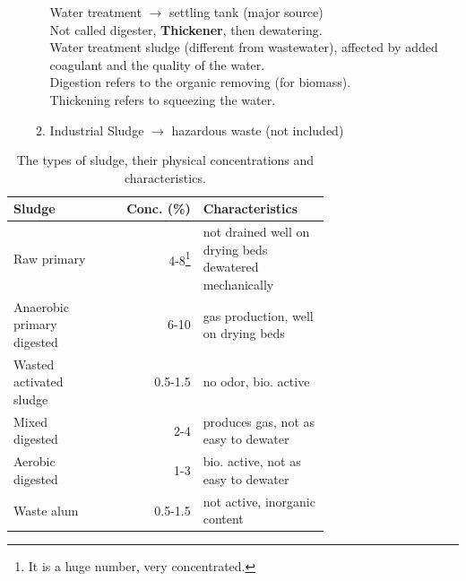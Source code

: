\documentclass[12pt]{article}
\begin{document}
\begin{itemize}
\begin{enumerate}
    Water treatment $\rightarrow$ settling tank (major source)\\
    Not called digester, \textbf{Thickener}, then dewatering.\\
    Water treatment sludge (different from wastewater), affected by added coagulant and the quality of the water.\\
    Digestion  refers to the organic removing (for biomass).\\
    Thickening refers to squeezing the water.
    \item Industrial Sludge $\rightarrow$ hazardous waste (not included)
    \end{enumerate}
\end{itemize}

\begin{table}[h]
    \caption{The types of sludge, their physical concentrations and characteristics.}
    \label{tab:table_1}
    \centering
    \begin{tabular}{p{0.3\linewidth}rp{0.4\linewidth}}
        \toprule
        Sludge & Conc. (\%) & Characteristics \\
        \midrule
        Raw primary & 4-8\footnote{It is a huge number, very concentrated.} & not drained well on drying beds \newline dewatered mechanically\\
        Anaerobic primary digested & 6-10 & gas production, well on drying beds\\
        Wasted activated sludge & 0.5-1.5 & no odor, bio. active\\
        Mixed digested & 2-4 & produces gas, not as easy to dewater\\
        Aerobic digested & 1-3 & bio. active, not as easy to dewater\\
        Waste alum & 0.5-1.5 & not active, inorganic content\\
        \bottomrule
    \end{tabular}
\end{table}
\end{document}
